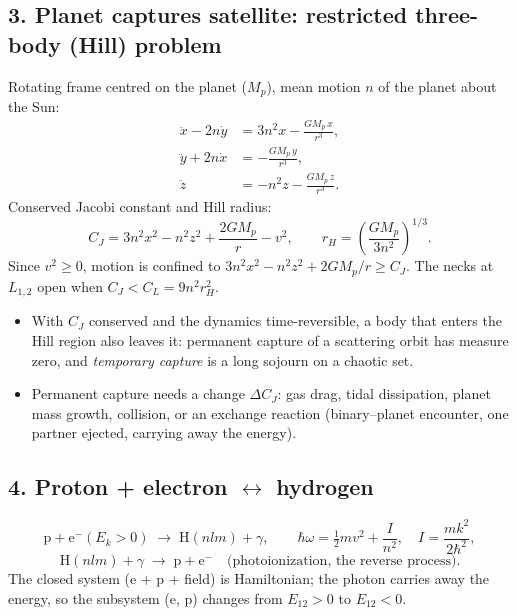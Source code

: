 \documentclass{article}
\begin{document}
\subsection*{3. Planet captures satellite: restricted three-body (Hill) problem}
Rotating frame centred on the planet ($M_p$), mean motion $n$ of the planet about the Sun:
\begin{align}
\ddot x-2n\dot y&=3n^{2}x-\frac{GM_p\,x}{r^{3}},\\
\ddot y+2n\dot x&=-\frac{GM_p\,y}{r^{3}},\\
\ddot z&=-n^{2}z-\frac{GM_p\,z}{r^{3}}.
\end{align}
Conserved Jacobi constant and Hill radius:
\begin{equation}
C_J=3n^{2}x^{2}-n^{2}z^{2}+\frac{2GM_p}{r}-v^{2},\qquad
r_H=\left(\frac{GM_p}{3n^{2}}\right)^{1/3}.
\end{equation}
Since $v^{2}\ge0$, motion is confined to
$3n^{2}x^{2}-n^{2}z^{2}+2GM_p/r\ge C_J$. The necks at $L_{1,2}$ open when
$C_J<C_{L}=9n^{2}r_H^{2}$.
\begin{itemize}
  \item With $C_J$ conserved and the dynamics time-reversible, a body that enters
        the Hill region also leaves it: permanent capture of a scattering orbit has
        measure zero, and \emph{temporary capture} is a long sojourn on a chaotic set.
  \item Permanent capture needs a change $\Delta C_J$: gas drag, tidal
        dissipation, planet mass growth, collision, or an exchange reaction
        (binary--planet encounter, one partner ejected, carrying away the energy).
\end{itemize}

\subsection*{4. Proton + electron $\leftrightarrow$ hydrogen}
\begin{equation}
\mathrm p+\mathrm e^-(E_k>0)\;\longrightarrow\;\mathrm H(nlm)+\gamma,
\qquad
\hbar\omega=\tfrac12mv^{2}+\frac{I}{n^{2}},\quad I=\frac{mk^{2}}{2\hbar^{2}},
\end{equation}
\begin{equation}
\mathrm H(nlm)+\gamma\;\longrightarrow\;\mathrm p+\mathrm e^-
\quad\text{(photoionization, the reverse process).}
\end{equation}
The closed system (e + p + field) is Hamiltonian; the photon carries away the
energy, so the subsystem (e, p) changes from $E_{12}>0$ to $E_{12}<0$.
\end{document}
